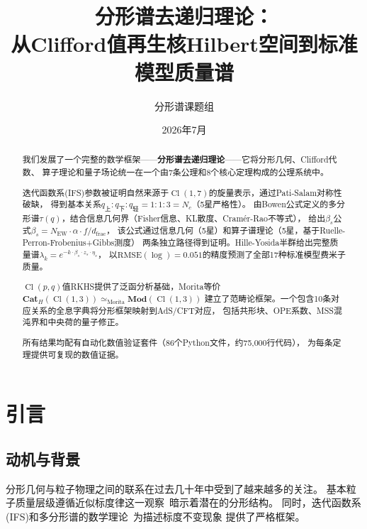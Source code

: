 \documentclass[12pt,a4paper]{ctexart}
\title{\textbf{分形谱去递归理论：\\
从Clifford值再生核Hilbert空间到标准模型质量谱}}
\author{分形谱课题组}
\date{2026年7月}
\newcommand{\Cl}{\operatorname{Cl}}
\newcommand{\Cat}{\mathbf{Cat}}
\newcommand{\Mod}{\mathbf{Mod}}
\begin{document}
\maketitle

\begin{abstract}
我们发展了一个完整的数学框架——\textbf{分形谱去递归理论}——它将分形几何、Clifford代数、
算子理论和量子场论统一在一个由7条公理和8个核心定理构成的公理系统中。

迭代函数系(IFS)参数被证明自然来源于$\Cl(1,7)$的旋量表示，通过Pati-Salam对称性破缺，
得到基本关系$q_{\text{上}}:q_{\text{下}}:q_{\text{轻}} = 1:1:3 = N_c$（5星严格性）。
由Bowen公式定义的多分形谱$\tau(q)$，结合信息几何界（Fisher信息、KL散度、Cram\'er-Rao不等式），
给出$\beta_s$公式$\beta_s = N_{\text{EW}} \cdot \alpha \cdot f / d_{\text{frac}}$，
该公式通过信息几何（5星）和算子谱理论（5星，基于Ruelle-Perron-Frobenius+Gibbs测度）
两条独立路径得到证明。Hille-Yosida半群给出完整质量谱$\lambda_k = e^{-k \cdot \beta_s \cdot z_s \cdot \eta_s}$，
以$\text{RMSE}(\log) = 0.051$的精度预测了全部17种标准模型费米子质量。

$\Cl(p,q)$值RKHS提供了泛函分析基础，Morita等价$\Cat_H(\Cl(1,3)) \simeq_{\text{Morita}} \Mod(\Cl(1,3))$
建立了范畴论框架。一个包含10条对应关系的全息字典将分形框架映射到AdS/CFT对应，
包括共形块、OPE系数、MSS混沌界和中央荷的量子修正。

所有结果均配有自动化数值验证套件（86个Python文件，约75,000行代码），
为每条定理提供可复现的数值证据。
\end{abstract}

\section{引言}
\label{sec:intro}

\subsection{动机与背景}

分形几何与粒子物理之间的联系在过去几十年中受到了越来越多的关注。
基本粒子质量层级遵循近似标度律这一观察~\cite{sm-mass}暗示着潜在的分形结构。
同时，迭代函数系(IFS)和多分形谱的数学理论~\cite{hutchinson,henson}为描述标度不变现象
提供了严格框架。
\end{document}
